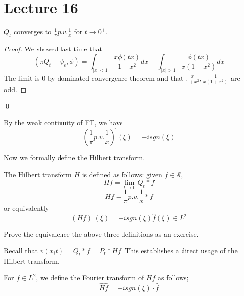 \section{Lecture 16}
\begin{proposition}
    $Q_t$ converges to $\frac{1}{\pi}p.v.\frac{1}{x}$ for $t\to 0^+$.
\end{proposition}
\begin{proof}
    We showed last time that
    \begin{equation*}
        (\pi Q_t-\psi_\epsilon,\phi)=\int_{|x|<1}\frac{x\phi(tx)}{1+x^2}dx-\int_{|x|>1}\frac{\phi(tx)}{x(1+x^2)}dx
    \end{equation*}
    The limit is 0 by dominated convergence theorem and that $\frac{x}{1+x^2},\frac{1}{x(1+x^2)}$ are odd.
\end{proof}
\qed

By the weak continuity of FT, we have
\begin{equation*}
    \left(\frac{1}{\pi}p.v.\frac{1}{x}\right)^{\widehat{\phantom{.}}}(\xi)=-isgn(\xi)
\end{equation*}

Now we formally define the Hilbert transform.
\begin{definition}
    The Hilbert transform $H$ is defined as follows: given $f\in\mathcal{S}$,
    \begin{equation*}
        Hf=\lim_{t\to0}Q_t\ast f
    \end{equation*}
    \begin{equation*}
        Hf=\frac{1}{\pi}p.v.\frac{1}{x}\ast f
    \end{equation*}
    or equivalently
    \begin{equation*}
        (Hf)^{\widehat{\phantom{.}}}(\xi)=-isgn(\xi)\hat{f}(\xi)\in L^2
    \end{equation*}
\end{definition}
\begin{exercise}
    Prove the equivalence the above three definitions as an exercise.
\end{exercise}

\begin{remark}
    Recall that $v(x_it)=Q_t\ast f=P_t\ast Hf$. This establishes a direct usage of the Hilbert transform.
\end{remark}

\begin{definition}
    For $f\in L^2$, we define the Fourier transform of $Hf$ as follows;
    \begin{equation*}
        \widehat{Hf}=-isgn(\xi)\cdot\hat{f}
    \end{equation*}
\end{definition}

